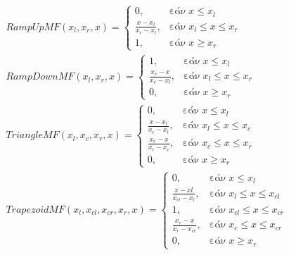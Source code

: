 \begin{align}
	RampUpMF(x_l, x_r, x) = 
		\begin{cases}
			0, &\text{εάν}\; x \leq x_l\\
			\frac{x-x_l}{x_r-x_l}	, &\text{εάν}\; x_l \leq x \leq x_r\\
			1, &\text{εάν}\; x \geq x_r			 
		\end{cases}\\[0.5cm]
	RampDownMF(x_l, x_r, x) = 
		\begin{cases}
			1, &\text{εάν}\; x \leq x_l\\
			\frac{x_r-x}{x_r-x_l}	, &\text{εάν}\; x_l \leq x \leq x_r\\
			0, &\text{εάν}\; x \geq x_r			 
		\end{cases}\\[0.5cm]
	TriangleMF(x_l, x_c, x_r, x) =
		\begin{cases}
			0, &\text{εάν}\; x \leq x_l\\
			\frac{x-x_l}{x_c-x_l}	, &\text{εάν}\; x_l \leq x \leq x_c\\
			\frac{x_r-x}{x_r-x_c}, &\text{εάν}\; x_c \leq x \leq x_r\\
			0, &\text{εάν}\; x \geq x_r
		\end{cases}\\[0.5cm]
	TrapezoidMF(x_l, x_{cl}, x_{cr}, x_r, x) =
		\begin{cases}
			0, &\text{εάν}\; x \leq x_l\\
			\frac{x-xl}{x_{cl}-x_l}	, &\text{εάν}\; x_l \leq x \leq x_{cl}\\
			1, & \text{εάν}\; x_{cl} \leq x \leq x_{cr}\\
			\frac{x_r-x}{x_r-x_{cr}}, &\text{εάν}\; x_c \leq x \leq x_{cr}\\
			0, &\text{εάν}\; x \geq x_r			 
		\end{cases}
\end{align}

